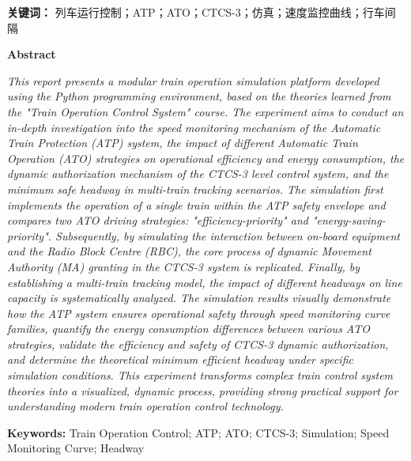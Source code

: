 \documentclass[11pt, a4paper]{ctexart}
\begin{document}
\vspace{1cm}
\noindent\textbf{关键词：} 列车运行控制；ATP；ATO；CTCS-3；仿真；速度监控曲线；行车间隔

\newpage

\begin{center}
    \Large\bfseries Abstract
\end{center}
\vspace{0.5cm}
\begin{spacing}{1.2} %
\noindent\textit{
This report presents a modular train operation simulation platform developed using the Python programming environment, based on the theories learned from the "Train Operation Control System" course. The experiment aims to conduct an in-depth investigation into the speed monitoring mechanism of the Automatic Train Protection (ATP) system, the impact of different Automatic Train Operation (ATO) strategies on operational efficiency and energy consumption, the dynamic authorization mechanism of the CTCS-3 level control system, and the minimum safe headway in multi-train tracking scenarios. The simulation first implements the operation of a single train within the ATP safety envelope and compares two ATO driving strategies: "efficiency-priority" and "energy-saving-priority". Subsequently, by simulating the interaction between on-board equipment and the Radio Block Centre (RBC), the core process of dynamic Movement Authority (MA) granting in the CTCS-3 system is replicated. Finally, by establishing a multi-train tracking model, the impact of different headways on line capacity is systematically analyzed. The simulation results visually demonstrate how the ATP system ensures operational safety through speed monitoring curve families, quantify the energy consumption differences between various ATO strategies, validate the efficiency and safety of CTCS-3 dynamic authorization, and determine the theoretical minimum efficient headway under specific simulation conditions. This experiment transforms complex train control system theories into a visualized, dynamic process, providing strong practical support for understanding modern train operation control technology.
}
\end{spacing}

\vspace{1cm}
\noindent\textbf{Keywords:} Train Operation Control; ATP; ATO; CTCS-3; Simulation; Speed Monitoring Curve; Headway
\newpage

\tableofcontents %
\newpage
\end{document}
